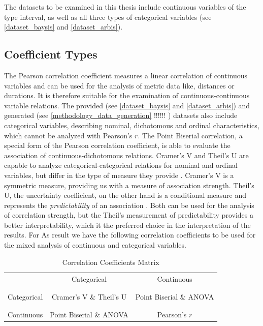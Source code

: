 \documentclass[a4paper,12pt]{report}
\begin{document}
The datasets to be examined in this thesis include continuous variables of the type interval, as well as all three types of categorical variables (see \ref{dataset_baysis} and \ref{dataset_arbis}).

\subsection{Coefficient Types}
The Pearson correlation coefficient measures a linear correlation of continuous variables and can be used for the analysis of metric data like, distances or durations. It is therefore suitable for the examination of continuous-continuous variable relations. The provided (see \ref{dataset_baysis} and \ref{dataset_arbis}) and generated (see \ref{methodology_data_generation} !!!!!! ) datasets also include categorical variables, describing nominal, dichotomous and ordinal characteristics, which cannot be analyzed with Pearson's $r$. The Point Biserial correlation, a special form of the Pearson correlation coefficient, is able to evaluate the association of continuous-dichotomous relations. Cramer’s V and Theil’s U are capable to analyze categorical-categorical relations for nominal and ordinal variables, but differ in the type of measure they provide \cite{OutsideTwoStandardDeviations2018}. Cramer’s V is a symmetric measure, providing us with a measure of association strength. Theil’s U, the uncertainty coefficient, on the other hand is a conditional measure and represents the \textit{predictability} of an association \cite{Akoglu2018,StackExchange2020}. Both can be used for the analysis of correlation strength, but the Theil’s measurement of predictability provides a better interpretability, which it the preferred  choice in the interpretation of the results. For As result we have the following correlation coefficients to be used for the mixed analysis of continuous and categorical variables.

\bigskip

\begin{table}[ht]
	\centering
	\begin{tabular}{c|c|c}
					& Categorical 				& Continuous \\
		\\[-1em]
		\hline
		\\[-1em]
		Categorical & Cramer’s V \& Theil’s U 	& Point Biserial \& ANOVA \\
		\\[-1em]
		\hline
		\\[-1em]
		Continuous 	& Point Biserial \& ANOVA 	& Pearson's $r$ \\
	\end{tabular}
	\caption{\label{tab:table-name}Correlation Coefficients Matrix}
\end{table}
\end{document}
